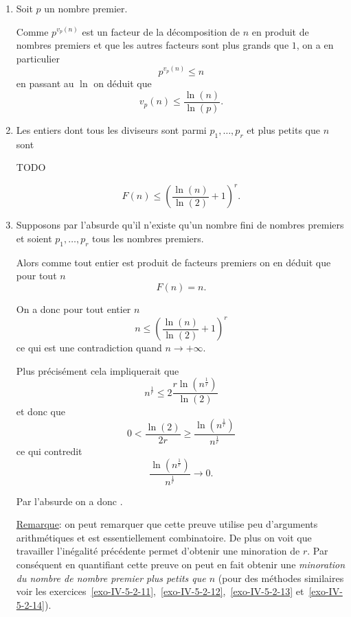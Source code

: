 \begin{sol}
    \begin{enumerate}
        \item Soit $p$ un nombre premier.

              Comme $p^{v_p(n)}$ est un facteur de la décomposition de $n$ en produit de nombres premiers et que les autres facteurs sont plus grands que $1$, on a en particulier
              \[p^{v_p(n)} \leq n\]
              en passant au $\ln$ on déduit que
              \[\boxed{v_p(n) \leq \frac{\ln(n)}{\ln(p)}}.\]

        \item Les entiers dont tous les diviseurs sont parmi $p_1,\ldots,p_r$ et plus petits que $n$ sont
        
        TODO

              \[\boxed{F(n) \leq \left(\frac{\ln(n)}{\ln(2)}+1 \right)^r}.\]
        \item Supposons par l'absurde qu'il n'existe qu'un nombre fini de nombres premiers et soient $p_1,\ldots,p_r$ tous les nombres premiers.

              Alors comme tout entier est produit de facteurs premiers on en déduit que pour tout $n$
              \[F(n) = n.\]

              On a donc pour tout entier $n$
              \[n \leq \left(\frac{\ln(n)}{\ln(2)}+1 \right)^r\]
              ce qui est une contradiction quand $n \to + \infty$.

              Plus précisément cela impliquerait que
              \[n^\frac{1}{r} \leq 2\frac{r \ln\left(n^\frac{1}{r} \right)}{\ln(2)}\]
              et donc que
              \[0 <\frac{\ln(2)}{2r} \geq \frac{\ln(n^\frac{1}{r})}{n^\frac{1}{r}}\]
              ce qui contredit
              \[\frac{\ln(n^\frac{1}{r})}{n^\frac{1}{r}} \to 0.\]

              Par l'absurde on a donc .

              \underline{Remarque}: on peut remarquer que cette preuve utilise peu d'arguments arithmétiques et est essentiellement combinatoire. De plus on voit que travailler l'inégalité précédente permet d'obtenir une minoration de $r$. Par conséquent en quantifiant cette preuve on peut en fait obtenir une \emph{minoration du nombre de nombre premier plus petits que $n$} (pour des méthodes similaires voir les exercices~\ref{exo-IV-5-2-11},~\ref{exo-IV-5-2-12},~\ref{exo-IV-5-2-13} et~\ref{exo-IV-5-2-14}).
    \end{enumerate}
\end{sol}

